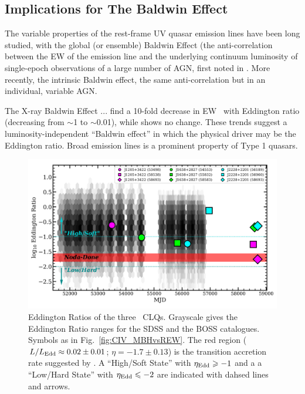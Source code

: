 \documentclass[fleqn,usenatbib]{mnras}
\begin{document}
\subsection{Implications for The Baldwin Effect}
The variable properties of the rest-frame UV quasar emission lines have been long studied, with the global (or ensemble) Baldwin Effect (the anti-correlation between the EW of the emission line and the underlying continuum luminosity of single-epoch observations of a large number of AGN, first noted in \citet{Baldwin1977}.  More recently, the intrinsic Baldwin effect, the same anti-correlation but in an individual, variable AGN.  

The X-ray Baldwin Effect \citep[e.g., ][]{Iwasawa_Taniguchi1993}... \citet{Bachev2004} find a 10-fold decrease in EW \civ\ with Eddington ratio (decreasing from $\sim$1 to $\sim$0.01), while \nv shows no change. These trends suggest a luminosity-independent ``Baldwin effect'' in which the physical driver may be the Eddington ratio. \citet{Ge2016} Broad emission lines is a prominent property of Type 1 quasars. 



\begin{figure}
  \centering
  \includegraphics[width=14.5cm, trim=0.2cm 0.2cm 0.0cm 0.2cm, clip]
  {figures/MJD_vs_Eddington_20191202.png}
  \vspace{-12pt}
  \caption[]{Eddington Ratios of the three \civ\ CLQs.
    Grayscale gives the Eddington Ratio ranges for the SDSS
    \citep[from ][]{Shen2011} and the BOSS \citep[from ][]{Kozlowski2017} 
    catalogues.
    Symbols as in Fig.~\ref{fig:CIV_MBHvsREW}.
    The red region ($L / L_{\rm Edd} \approx 0.02\pm0.01$;  $\eta =-1.7\pm0.13$) is
    the transition accretion rate suggested by \citet{NodaDone2018}.
    A ``High/Soft State'' with $\eta_{\rm Edd} \geq -1$ and a
    a ``Low/Hard State'' with $\eta_{\rm Edd} \leq -2$ are indicated 
    with dahsed lines and arrows. 
  }
  \label{fig:Eddington_ratios}
\end{figure}
\end{document}
